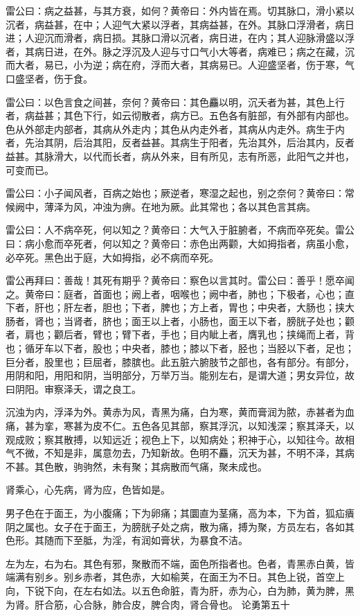 \documentclass[a4paper,12pt,UTF8,twoside]{ctexbook}
\begin{document}
	雷公曰：病之益甚，与其方衰，如何？黄帝曰：外内皆在焉。切其脉口，滑小紧以沉者，病益甚，在中；人迎气大紧以浮者，其病益甚，在外。其脉口浮滑者，病日进；人迎沉而滑者，病日损。其脉口滑以沉者，病日进，在内；其人迎脉滑盛以浮者，其病日进，在外。脉之浮沉及人迎与寸口气小大等者，病难已；病之在藏，沉而大者，易已，小为逆；病在府，浮而大者，其病易已。人迎盛坚者，伤于寒，气口盛坚者，伤于食。
	
	雷公曰：以色言食之间甚，奈何？黄帝曰：其色麤以明，沉夭者为甚，其色上行者，病益甚；其色下行，如云彻散者，病方已。五色各有脏部，有外部有内部也。色从外部走内部者，其病从外走内；其色从内走外者，其病从内走外。病生于内者，先治其阴，后治其阳，反者益甚。其病生于阳者，先治其外，后治其内，反者益甚。其脉滑大，以代而长者，病从外来，目有所见，志有所恶，此阳气之并也，可变而已。
	
	雷公曰：小子闻风者，百病之始也；厥逆者，寒湿之起也，别之奈何？黄帝曰：常候阙中，薄泽为风，冲浊为痹。在地为厥。此其常也；各以其色言其病。
	
	雷公曰：人不病卒死，何以知之？黄帝曰：大气入于脏腑者，不病而卒死矣。雷公曰：病小愈而卒死者，何以知之？黄帝曰：赤色出两颧，大如拇指者，病虽小愈，必卒死。黑色出于庭，大如拇指，必不病而卒死。
	
	雷公再拜曰：善哉！其死有期乎？黄帝曰：察色以言其时。雷公曰：善乎！愿卒闻之。黄帝曰：庭者，首面也；阙上者，咽喉也；阙中者，肺也；下极者，心也；直下者，肝也；肝左者，胆也；下者，脾也；方上者，胃也；中央者，大肠也；挟大肠者，肾也；当肾者，脐也；面王以上者，小肠也，面王以下者，膀胱子处也；颧者，肩也；颧后者，臂也；臂下者，手也；目内眦上者，膺乳也；挟绳而上者，背也；循牙车以下者，股也；中央者，膝也；膝以下者，胫也；当胫以下者，足也；巨分者，股里也；巨屈者，膝膑也。此五脏六腑肢节之部也，各有部分。有部分，用阴和阳，用阳和阴，当明部分，万举万当。能别左右，是谓大道；男女异位，故曰阴阳。审察泽夭，谓之良工。
	
	沉浊为内，浮泽为外。黄赤为风，青黑为痛，白为寒，黄而膏润为脓，赤甚者为血痛，甚为挛，寒甚为皮不仁。五色各见其部，察其浮沉，以知浅深；察其泽夭，以观成败；察其散搏，以知远近；视色上下，以知病处；积神于心，以知往今。故相气不微，不知是非，属意勿去，乃知新故。色明不麤，沉天为甚，不明不泽，其病不甚。其色散，驹驹然，未有聚；其病散而气痛，聚未成也。
	
	肾乘心，心先病，肾为应，色皆如是。
	
	男子色在于面王，为小腹痛；下为卵痛；其圜直为茎痛，高为本，下为首，狐疝㿉阴之属也。女子在于面王，为膀胱子处之病，散为痛，搏为聚，方员左右，各如其色形。其随而下至胝，为淫，有润如膏状，为暴食不洁。
	
	左为左，右为右。其色有邪，聚散而不端，面色所指者也。色者，青黑赤白黄，皆端满有别乡。别乡赤者，其色赤，大如榆荚，在面王为不日。其色上锐，首空上向，下锐下向，在左右如法。以五色命脏，青为肝，赤为心，白为肺，黄为脾，黑为肾。肝合筋，心合脉，肺合皮，脾合肉，肾合骨也。
	论勇第五十
	
\end{document}
